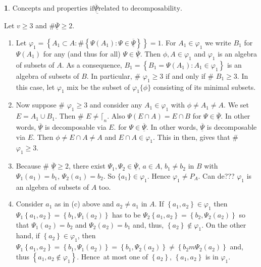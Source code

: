 \documentclass[a4paper,12pt]{article}
\theoremstyle{definition}
\theoremstyle{underlinethm}
\theoremstyle{underline}
\newtheorem{subsubsec}{}[subsection]
\begin{document}
\begin{subsubsec}\label{subsubsection-3.1.3}
$\underline{\text{Concepts and properties if} \underline{\overline{\Psi}} \text{related to decomposability}.}$

Let $v\geq 3$ and $\# \underline{\overline{\Psi}} \geq 2$.

\begin{enumerate}[label=(\alph*)]

\item  Let $\varphi_{1} = \left\{A_{1} \subset A : \# \left\{\Psi (A_{1}) : \Psi \in \underline{\overline{\Psi}} \right\} \right\} =1$. For $A_{1} \in \varphi_{1}$ we write $B_{1}$ for $\Psi(A_{1})$ for any (and thus for all) $\Psi \in \underline{\overline{\Psi}}$. Then $\phi, A \in \varphi_{1}$ and $\varphi_{1}$ is an algebra of subsets of $A$. As a consequence, $B_{1} = \left\{B_{1}= \Psi(A_{1}) : A_{1} \in \varphi_{1} \right\}$ is an algebra of subsets of $B$. In particular, \# $\varphi_{1} \geq 3$ if and only if \# $B_{1} \geq 3$. In this case, let $\varphi_{1}$ mix be the subset of $\varphi_{1}\{\phi\}$ consisting of its minimal subsets.

\item Now suppose \# $\varphi_{1} \geq 3$ and consider any $A_{1} \in \varphi_{1}$ with $\phi \neq A_{1}\neq A$. We set $E = A_{1} \cup B_{1}$. Then \# $E \neq \lceil_{n}$. Also $\Psi(E \cap A) = E \cap B$ for $\Psi \in \underline{\overline{\Psi}}$. In other words, $\underline{\overline{\Psi}}$ is decomposable via $E$. for $\Psi \in \underline{\overline{\Psi}}$. In other words, $\underline{\overline{\Psi}}$ is decomposable via $E$. Then $\phi \neq E \cap A \neq A$ and $E \cap A \in \varphi_{1}$. This in then, gives that \# $\varphi_{1} \geq 3$. 

\item Because \# $\underline{\overline{\Psi}} \geq 2$, there exist $\Psi_{1}, \Psi_{2} \in \underline{\overline{\Psi}}$, $a \in A$, $b_{1} \neq b_{2}$ in $B$ with $\Psi_{1}(a_{1}) = b_{1}$, $\Psi_{2}(a_{1}) = b_{2}$. So $\{a_{1}\} \in \varphi_{1}$. Hence $\varphi_{1} \neq P_{A}$. Can de??? $\varphi_{1}$ is an algebra of subsets of $A$ too.

\item Consider $a_{1}$ as in (c) above and $a_{2}\neq a_{1}$ in $A$. If $\left\{a_{1}, a_{2} \right\} \in \varphi_{1}$ then $\Psi_{1}\left\{a_{1}, a_{2} \right\} = \left\{b_{1},\Psi_{1} (a_{2})\right\}$ has to be $\Psi_{2}\left\{a_{1}, a_{2} \right\} = \left\{b_{2},\Psi_{2} (a_{2})\right\}$ so that $\Psi_{1}(a_{2}) = b_{2}$ and $\Psi_{2}(a_{2}) = b_{1}$ and, thus, $\left\{a_{2}\right\} \notin \varphi_{1}$. On the other hand, if $\left\{a_{2}\right\} \in \varphi_{1}$, then $\Psi_{1}\left\{a_{1}, a_{2}\right\} = \left\{b_{1}, \Psi_{1}(a_{2})\right\} = \left\{b_{1}, \Psi_{2}(a_{2})\right\} \neq \left\{b_{2}m \Psi_{2}(a_{2})\right\}$ and, thus $\left\{a_{1}, a_{2} \notin \varphi_{1}\right\}$. Hence\, at most one of $\left\{a_{2}\right\}$, $\left\{a_{1}, a_{2}\right\}$ is in $\varphi_{1}$.


\end{enumerate}
\end{subsubsec}
\end{document}

